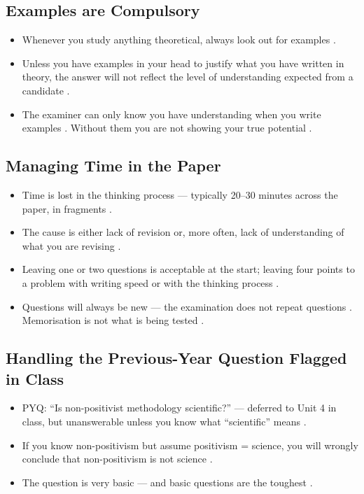 \subsection{Examples are Compulsory}
\begin{itemize}
    \item Whenever you study anything theoretical, always look out for examples .
    \item Unless you have examples in your head to justify what you have written in theory, the answer will not reflect the level of understanding expected from a candidate .
    \item The examiner can only know you have understanding when you write examples . Without them you are not showing your true potential .
\end{itemize}

\subsection{Managing Time in the Paper}
\begin{itemize}
    \item Time is lost in the thinking process --- typically 20--30 minutes across the paper, in fragments .
    \item The cause is either lack of revision or, more often, lack of understanding of what you are revising .
    \item Leaving one or two questions is acceptable at the start; leaving four points to a problem with writing speed or with the thinking process .
    \item Questions will always be new --- the examination does not repeat questions . Memorisation is not what is being tested .
\end{itemize}

\subsection{Handling the Previous-Year Question Flagged in Class}
\begin{PYQLink}
\begin{itemize}
    \item PYQ: ``Is non-positivist methodology scientific?'' --- deferred to Unit 4 in class, but unanswerable unless you know what ``scientific'' means .
    \item If you know non-positivism but assume positivism = science, you will wrongly conclude that non-positivism is not science .
    \item The question is very basic --- and basic questions are the toughest .
\end{itemize}
\end{PYQLink}

